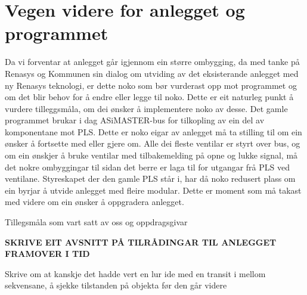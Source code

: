 \section{Vegen videre for anlegget og programmet}
\thispagestyle{fancy}


Da vi forventar at anlegget går igjennom ein større ombygging, da med tanke på Renasys og Kommunen sin dialog om utviding av det eksisterande anlegget med ny Renasys teknologi, er dette noko som bør vurderast opp mot programmet og om det blir behov for å endre eller legge til noko. 
Dette er eit naturleg punkt å vurdere tilleggsmåla, om dei ønsker å implementere noko av desse.
Det gamle programmet brukar i dag ASiMASTER-bus for tilkopling av ein del av komponentane mot PLS. 
Dette er noko eigar av anlegget må ta stilling til om ein ønsker å fortsette med eller gjere om. Alle dei fleste ventilar er styrt over bus, og om ein ønskjer å bruke ventilar med tilbakemelding på opne og lukke signal, må det nokre ombyggingar til sidan det berre er laga til for utgangar frå PLS ved ventilane.
Styreskapet der den gamle PLS står i, har då noko redusert plass om ein byrjar å utvide anlegget med fleire modular. 
Dette er moment som må takast med videre om ein ønsker å oppgradera anlegget. 

Tillegsmåla som vart satt av oss og oppdragsgivar

\textbf{SKRIVE EIT AVSNITT PÅ TILRÅDINGAR TIL ANLEGGET FRAMOVER I TID}

Skrive om at kanskje det hadde vert en lur ide med en transit i mellom sekvensane, å sjekke tilstanden på objekta før den går videre

